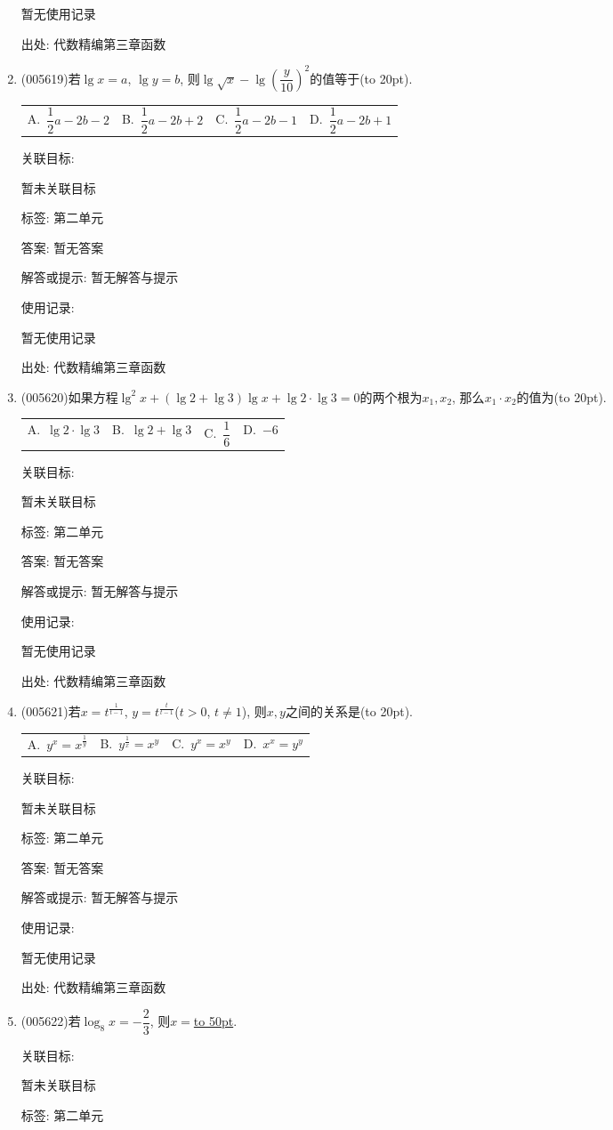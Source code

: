 \documentclass[10pt,a4paper]{article}
\newcommand{\blank}[1]{\underline{\hbox to #1pt{}}}
\newcommand{\bracket}[1]{(\hbox to #1pt{})}
\newcommand{\fourch}[4]{\par\begin{tabular}{p{.23\textwidth}p{.23\textwidth}p{.23\textwidth}p{.23\textwidth}}
A.~#1 &B.~#2& C.~#3& D.~#4
\end{tabular}}
\begin{document}
\begin{enumerate}[1.]
暂无使用记录


出处: 代数精编第三章函数
\item { (005619)}若$\lg x=a$, $\lg y=b$, 则$\lg \sqrt x-\lg (\dfrac y{10})^2$的值等于\bracket{20}.
\fourch{$\dfrac 12a-2b-2$}{$\dfrac 12a-2b+2$}{$\dfrac 12a-2b-1$}{$\dfrac 12a-2b+1$}


关联目标:

暂未关联目标



标签: 第二单元

答案: 暂无答案

解答或提示: 暂无解答与提示

使用记录:

暂无使用记录


出处: 代数精编第三章函数
\item { (005620)}如果方程$\lg ^2x+(\lg 2+\lg 3)\lg x+\lg 2\cdot \lg 3=0$的两个根为$x_1,x_2$, 那么$x_1\cdot x_2$的值为\bracket{20}.
\fourch{$\lg 2\cdot \lg 3$}{$\lg 2+\lg 3$}{$\dfrac 16$}{$-6$}


关联目标:

暂未关联目标



标签: 第二单元

答案: 暂无答案

解答或提示: 暂无解答与提示

使用记录:

暂无使用记录


出处: 代数精编第三章函数
\item { (005621)}若$x=t^{\frac 1{t-1}}$, $y=t^{\frac t{t-1}}$($t>0$, $t\ne 1$), 则$x,y$之间的关系是\bracket{20}.
\fourch{$y^x=x^{\frac 1y}$}{$y^{\frac 1x}=x^y$}{$y^x=x^y$}{$x^x=y^y$}


关联目标:

暂未关联目标



标签: 第二单元

答案: 暂无答案

解答或提示: 暂无解答与提示

使用记录:

暂无使用记录


出处: 代数精编第三章函数
\item { (005622)}若$\log_8x=-\dfrac 23$, 则$x=$\blank{50}.


关联目标:

暂未关联目标



标签: 第二单元


\end{enumerate}
\end{document}
